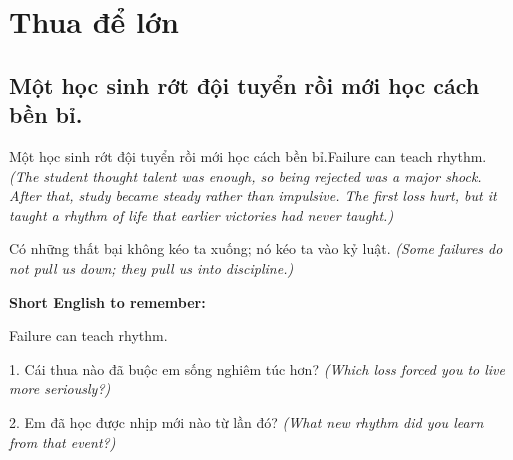 \chapter{Thua để lớn}

\section{Một học sinh rớt đội tuyển rồi mới học cách bền bỉ.}
\begin{truyen}{Một học sinh rớt đội tuyển rồi mới học cách bền bỉ.}{Failure can teach rhythm.}
\textit{(The student thought talent was enough, so being rejected was a major shock. After that, study became steady rather than impulsive. The first loss hurt, but it taught a rhythm of life that earlier victories had never taught.)}
\end{truyen}
\begin{baihoc}
Có những thất bại không kéo ta xuống; nó kéo ta vào kỷ luật.
\textit{(Some failures do not pull us down; they pull us into discipline.)}
\end{baihoc}
\begin{ghinhoanh}\textbf{Short English to remember:}

Failure can teach rhythm.
\end{ghinhoanh}
\begin{tuhocnhanh}
1. Cái thua nào đã buộc em sống nghiêm túc hơn? \textit{(Which loss forced you to live more seriously?)}

2. Em đã học được nhịp mới nào từ lần đó? \textit{(What new rhythm did you learn from that event?)}
\end{tuhocnhanh}
\ngancach

